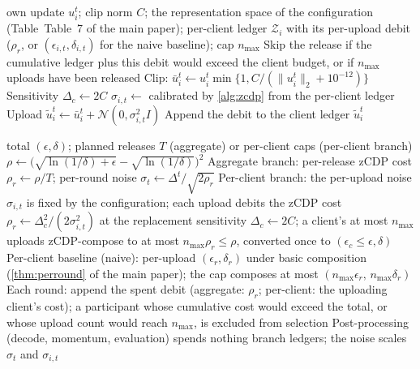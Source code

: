 \documentclass[a4paper,fleqn]{cas-dc}
\begin{document}
\begin{algorithm}[tbp]
\caption{Per-client Gaussian release branch (baseline; no trusted aggregator)}
\label{alg:pcrelease}
\begin{algorithmic}[1]
\Require own update $u_i^t$; clip norm $C$; the representation space of
the configuration (Table~Table~7 of the main paper); per-client ledger
$\mathcal{Z}_i$ with its per-upload debit ($\rho_r$, or
$(\epsilon_{i,t},\delta_{i,t})$ for the naive baseline); cap $n_{\max}$
\State Skip the release if the cumulative ledger plus this debit would
exceed the client budget, or if $n_{\max}$ uploads have been released
\State Clip: $\bar u_i^t\gets u_i^t\min\{1,C/(\|u_i^t\|_2+10^{-12})\}$
\State Sensitivity $\Delta_c\gets 2C$ 
\State $\sigma_{i,t}\gets$ calibrated by \cref{alg:zcdp} from the
per-client ledger
\State Upload $\widetilde u_i^t\gets\bar u_i^t+\mathcal{N}(0,\sigma_{i,t}^2 I)$
\State Append the debit to the client ledger
\State \Return $\widetilde u_i^t$ 
\end{algorithmic}
\end{algorithm}
\begin{algorithm}[tbp]
\caption{Privacy-budget allocation and ledger update}
\label{alg:zcdp}
\begin{algorithmic}[1]
\Require total $(\epsilon,\delta)$; planned releases $T$ (aggregate) or
per-client caps (per-client branch)
\State $\rho\gets\big(\sqrt{\ln(1/\delta)+\epsilon}-\sqrt{\ln(1/\delta)}\big)^2$
\State Aggregate branch: per-release zCDP cost $\rho_r\gets\rho/T$; per-round
noise $\sigma_t\gets\Delta^t/\sqrt{2\rho_r}$
\State Per-client branch: the per-upload noise $\sigma_{i,t}$ is fixed by
the configuration; each upload debits the zCDP cost
$\rho_r\gets\Delta_c^2/(2\sigma_{i,t}^2)$ at the replacement
sensitivity $\Delta_c\gets 2C$; a client's at most
$n_{\max}$ uploads zCDP-compose to at most $n_{\max}\rho_r\le\rho$,
converted once to $(\epsilon_c\le\epsilon,\delta)$
\State Per-client baseline (naive): per-upload $(\epsilon_r,\delta_r)$
under basic composition (\cref{thm:perround} of the main paper); the cap
composes at most $(n_{\max}\epsilon_r,\,n_{\max}\delta_r)$
\State Each round: append the spent debit (aggregate: $\rho_r$; per-client:
the uploading client's cost); a participant whose cumulative cost would
exceed the total, or whose upload count would reach $n_{\max}$, is
excluded from selection
\State Post-processing (decode, momentum, evaluation) spends nothing
\State \Return branch ledgers; the noise scales $\sigma_t$ and
$\sigma_{i,t}$
\end{algorithmic}
\end{algorithm}
\end{document}
